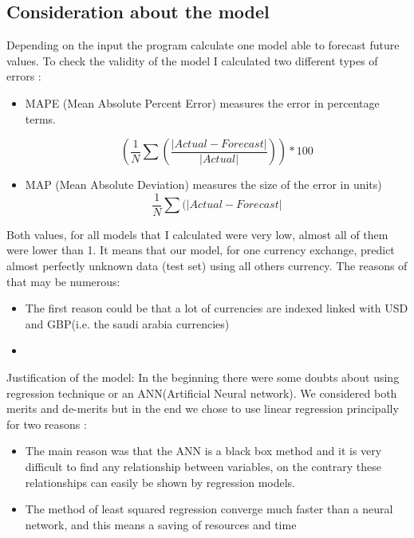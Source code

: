 \subsection{Consideration about the model}

Depending on the input the program calculate one model able to forecast future values. To check the validity of the model I calculated two different types of errors : 
\begin{itemize}
\item MAPE (Mean Absolute Percent Error) measures the error in percentage terms. 
\begin{center}
\[ (\frac{1}{N}\sum(\frac{|Actual-Forecast|}{|Actual|}))*100\]
\end{center}
\item MAP (Mean Absolute Deviation) measures the size of the error in units) 
\[ \frac{1}{N}\sum(|Actual-Forecast|\]
\end{itemize}
Both values, for all models that I calculated were very low, almost all of them were lower than 1. It means that our model, for one currency exchange, predict almost perfectly unknown data (test set) using all others currency. 
The reasons of that may be numerous:
\begin{itemize}
\item The first reason could be that a lot of currencies are indexed linked with USD and GBP(i.e. the saudi arabia currencies) 
\item

\end{itemize}


Justification of the model:
\newline
In the beginning there were some doubts about using regression technique or an ANN(Artificial Neural network)\cite{leung2000forecasting}.
We considered both merits and de-merits but in the end we chose to use linear regression principally for two reasons : 
\begin{itemize}
\item The main reason was that the ANN is a black box method and it is very difficult to find any relationship between variables, on the contrary these relationships can easily be shown by regression models. 
\item The method of least squared regression converge much faster than a neural network, and this means a saving of resources and time 
\end{itemize}

